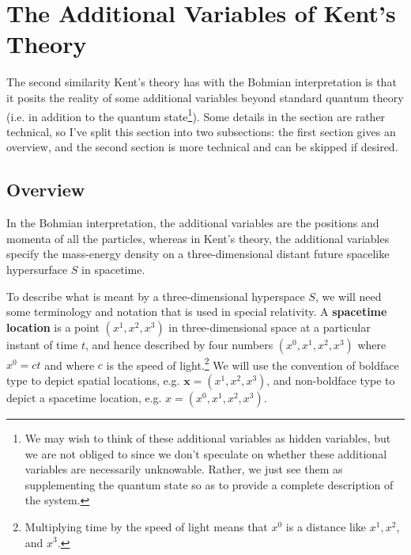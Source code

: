 \documentclass[12pt]{report}
\begin{document}
\section{The Additional Variables of Kent's Theory\label{additional}}
The second similarity Kent's theory has with the Bohmian interpretation is that it posits the reality of some additional variables beyond standard quantum theory (i.e. in addition to the quantum state\footnote{We may wish to think of these additional variables as hidden variables, but we are not obliged to since we don't speculate on whether these additional variables are necessarily unknowable. Rather, we just see them as supplementing the quantum state so as to provide a complete description of the system.}). Some details in the section are rather technical, so I've split this section into two subsections: the first section gives an overview, and the second section is more technical and can be skipped if desired. 
\subsection{Overview\label{additionalOverview}}
In the Bohmian interpretation, the additional variables are the positions and momenta of all the particles, whereas in Kent's theory, the additional variables specify the mass-energy density on a three-dimensional distant future spacelike hypersurface $S$  %
%
 in spacetime. 

To describe what is meant by a three-dimensional hyperspace $S$, we will need some terminology and notation that is used in special relativity. A \textbf{spacetime location}\label{spacetimedef} is a point $(x^1,x^2,x^3)$ in three-dimensional space at a particular instant of time $t$, and hence described by four numbers $(x^0,x^1,x^2,x^3)$  %
%
where $x^0=c t$  %
%
 and where $c$ is the speed of light.\footnote{Multiplying time by the speed of light means that $x^0$ is a distance like $x^1,x^2$, and $x^3$. } We will use the convention of boldface type to depict spatial locations, e.g. $\bm{x}=(x^1,x^2,x^3)$,  %
  and non-boldface type to depict a spacetime location, e.g. $x=(x^0,x^1,x^2,x^3)$.  %
\end{document}

